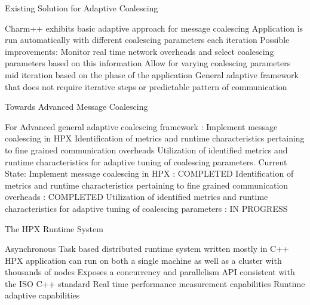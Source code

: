 \documentclass[10pt]{beamer}
\begin{document}
\begin{frame}{Existing Solution for Adaptive Coalescing}
\begin{outline}
	\1 Charm++ exhibits basic adaptive approach for message coalescing
	\1 Application is run automatically with different coalescing parameters each iteration
	\1 Possible improvements:
	\2 Monitor real time network overheads and select coalescing parameters based on this information
	\2 Allow for varying coalescing parameters mid iteration based on the phase of the application
	\2 General adaptive framework that does not require iterative steps or predictable pattern of communication
\end{outline}
\end{frame}

\begin{frame}{Towards Advanced Message Coalescing}
\begin{outline}
	\1 For Advanced general adaptive coalescing framework :
		\2 Implement message coalescing in HPX
		\2 Identification of metrics and runtime characteristics pertaining to fine grained communication overheads
		\2 Utilization of identified metrics and runtime characteristics for adaptive tuning of coalescing parameters.
	\1 Current State:
		\2 Implement message coalescing in HPX : \alert{COMPLETED}
		\2 Identification of metrics and runtime characteristics pertaining to fine grained communication overheads : \alert{COMPLETED}
		\2 Utilization of identified metrics and runtime characteristics for adaptive tuning of coalescing parameters : \alert{IN PROGRESS}
\end{outline}
\end{frame}

\begin{frame}{The HPX Runtime System}
\begin{outline}
	\1 Asynchronous Task based distributed runtime system written mostly in C++
	\1 HPX application can run on both a single machine as well as a cluster with thousands of nodes
	\1 Exposes a concurrency and parallelism API consistent with the ISO C++ standard
	\1 Real time performance measurement capabilities
	\1 Runtime adaptive capabilities
\end{outline}
\end{frame}
\end{document}
